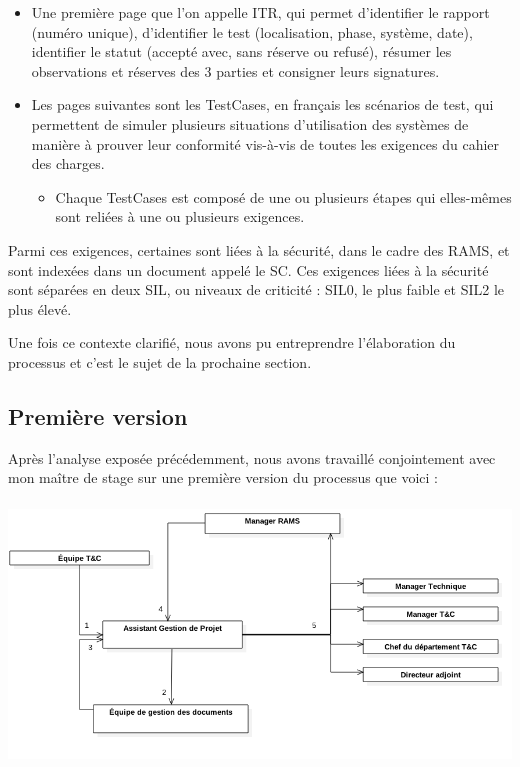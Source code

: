 \begin{itemize}
\item Une première page que l'on appelle ITR, qui permet d'identifier le rapport (numéro unique), d'identifier le test (localisation, phase, système, date), identifier le statut (accepté avec, sans réserve ou refusé), résumer les observations et réserves des 3 parties et consigner leurs signatures.
\item Les pages suivantes sont les \gls{TestCases}, en français les scénarios de test, qui permettent de simuler plusieurs situations d'utilisation des systèmes de manière à prouver leur conformité vis-à-vis de toutes les exigences du cahier des charges.
\begin{itemize}
\item Chaque \gls{TestCases} est composé de une ou plusieurs étapes qui elles-mêmes sont reliées à une ou plusieurs exigences.
\end{itemize}
\end{itemize}

Parmi ces exigences, certaines sont liées à la sécurité, dans le cadre des \gls{RAMS}, et sont indexées dans un document appelé le \gls{SC}. Ces exigences liées à la sécurité sont séparées en deux \gls{SIL}, ou niveaux de criticité : SIL0, le plus faible et SIL2 le plus élevé.

Une fois ce contexte clarifié, nous avons pu entreprendre l'élaboration du processus et c'est le sujet de la prochaine section.

\subsection{Première version}

Après l'analyse exposée précédemment, nous avons travaillé conjointement avec mon maître de stage sur une première version du processus que voici :

\begin{center}
\includegraphics[height=7cm]{ressources/images/figures/Workflow1.png}
\end{center}


